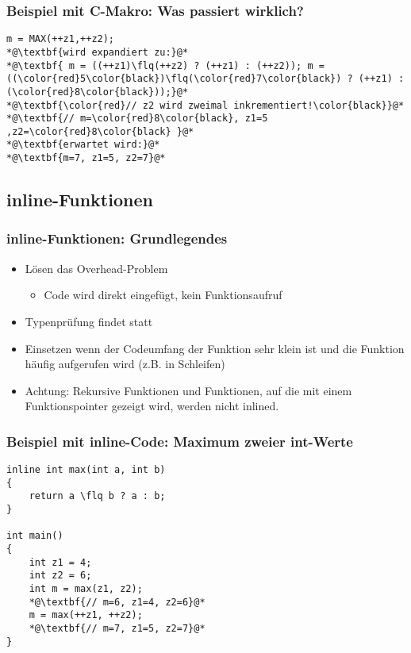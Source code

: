 \subsubsection{Beispiel mit C-Makro: Was passiert wirklich?\hfill}
\label{sec:unterunterabschnitt}
\noindent
\begin{minipage}{\linewidth}
\begin{lstlisting}
m = MAX(++z1,++z2);
*@\textbf{wird expandiert zu:}@*
*@\textbf{ m = ((++z1)\flq(++z2) ? (++z1) : (++z2)); m = ((\color{red}5\color{black})\flq(\color{red}7\color{black}) ? (++z1) : (\color{red}8\color{black}));}@*
*@\textbf{\color{red}// z2 wird zweimal inkrementiert!\color{black}}@*
*@\textbf{// m=\color{red}8\color{black}, z1=5 ,z2=\color{red}8\color{black} }@*
*@\textbf{erwartet wird:}@*
*@\textbf{m=7, z1=5, z2=7}@*
\end{lstlisting}
\end{minipage}


\subsection{inline-Funktionen\hfill}
\label{sec:unterabschnitt}

\subsubsection{inline-Funktionen: Grundlegendes\hfill}
\label{sec:unterunterabschnitt}
\begin{itemize}
	\item Lösen das Overhead-Problem
	\begin{itemize}
		\item Code wird direkt eingefügt, kein Funktionsaufruf
	\end{itemize}
	\item Typenprüfung findet statt
	\item Einsetzen wenn der Codeumfang der Funktion sehr klein ist und die Funktion häufig aufgerufen wird (z.B. in Schleifen)
	\item Achtung: Rekursive Funktionen und Funktionen, auf die mit einem Funktionspointer gezeigt wird, werden nicht inlined.
\end{itemize}

\subsubsection{Beispiel mit inline-Code: Maximum zweier int-Werte}
\label{sec:unterunterabschnitt}
\noindent
\begin{minipage}{\linewidth}
\begin{lstlisting}
inline int max(int a, int b)
{
	return a \flq b ? a : b;
}

int main()
{
	int z1 = 4;
	int z2 = 6;
	int m = max(z1, z2);
	*@\textbf{// m=6, z1=4, z2=6}@*
	m = max(++z1, ++z2);
	*@\textbf{// m=7, z1=5, z2=7}@*
}
\end{lstlisting}
\end{minipage}

